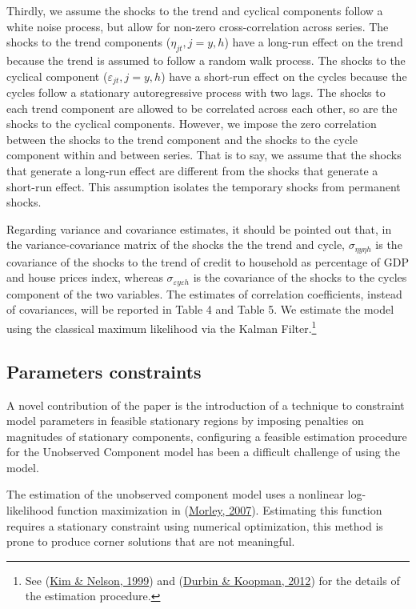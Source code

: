 \documentclass[
  12pt,
]{article}
\begin{document}
Thirdly, we assume the shocks to the trend and cyclical components follow a white noise process, but allow for non-zero cross-correlation across series. The shocks to the trend components (\(\eta_{jt}, j=y,h\)) have a long-run effect on the trend because the trend is assumed to follow a random walk process. The shocks to the cyclical component (\(\varepsilon_{jt}, j=y,h\)) have a short-run effect on the cycles because the cycles follow a stationary autoregressive process with two lags. The shocks to each trend component are allowed to be correlated across each other, so are the shocks to the cyclical components. However, we impose the zero correlation between the shocks to the trend component and the shocks to the cycle component within and between series. That is to say, we assume that the shocks that generate a long-run effect are different from the shocks that generate a short-run effect. This assumption isolates the temporary shocks from permanent shocks.

Regarding variance and covariance estimates, it should be pointed out that, in the variance-covariance matrix of the shocks the the trend and cycle, \(\sigma_{\eta y \eta h}\) is the covariance of the shocks to the trend of credit to household as percentage of GDP and house prices index, whereas \(\sigma_{\varepsilon y \varepsilon h}\) is the covariance of the shocks to the cycles component of the two variables. The estimates of correlation coefficients, instead of covariances, will be reported in Table 4 and Table 5. We estimate the model using the classical maximum likelihood via the Kalman Filter.\footnote{See (\protect\hyperlink{ref-kim_state-space_1999}{Kim \& Nelson, 1999}) and (\protect\hyperlink{ref-durbin_time_2012}{Durbin \& Koopman, 2012}) for the details of the estimation procedure.}

\hypertarget{parameters-constraints}{%
\subsection{Parameters constraints}\label{parameters-constraints}}

A novel contribution of the paper is the introduction of a technique to constraint model parameters in feasible stationary regions by imposing penalties on magnitudes of stationary components, configuring a feasible estimation procedure for the Unobserved Component model has been a difficult challenge of using the model.

The estimation of the unobserved component model uses a nonlinear log-likelihood function maximization in (\protect\hyperlink{ref-morley_slow_2007}{Morley, 2007}). Estimating this function requires a stationary constraint using numerical optimization, this method is prone to produce corner solutions that are not meaningful.
\end{document}
